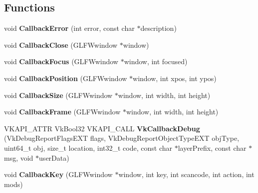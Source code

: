 \subsection*{Functions}
\begin{DoxyCompactItemize}
\item 
\mbox{\label{namespace_flounder_a521c98dcf5547d4998daba9ab53dcd65}} 
void {\bfseries Callback\+Error} (int error, const char $\ast$description)
\item 
\mbox{\label{namespace_flounder_ada14436f2fe02893e7fe7b90d5fb25dc}} 
void {\bfseries Callback\+Close} (G\+L\+F\+Wwindow $\ast$window)
\item 
\mbox{\label{namespace_flounder_a6fa362f255ac8427c2be120fd5baed79}} 
void {\bfseries Callback\+Focus} (G\+L\+F\+Wwindow $\ast$window, int focused)
\item 
\mbox{\label{namespace_flounder_a207d2617f7f9d609f9aad5c9b6b5693f}} 
void {\bfseries Callback\+Position} (G\+L\+F\+Wwindow $\ast$window, int xpos, int ypos)
\item 
\mbox{\label{namespace_flounder_aceb00ffb4c36e8daafa5687e9233b09e}} 
void {\bfseries Callback\+Size} (G\+L\+F\+Wwindow $\ast$window, int width, int height)
\item 
\mbox{\label{namespace_flounder_a492cfd0c11cdb2a74fb82b3c2ada3eee}} 
void {\bfseries Callback\+Frame} (G\+L\+F\+Wwindow $\ast$window, int width, int height)
\item 
\mbox{\label{namespace_flounder_a2e14b3449c0aaf0ef359aa1538c54b7d}} 
V\+K\+A\+P\+I\+\_\+\+A\+T\+TR Vk\+Bool32 V\+K\+A\+P\+I\+\_\+\+C\+A\+LL {\bfseries Vk\+Callback\+Debug} (Vk\+Debug\+Report\+Flags\+E\+XT flags, Vk\+Debug\+Report\+Object\+Type\+E\+XT obj\+Type, uint64\+\_\+t obj, size\+\_\+t location, int32\+\_\+t code, const char $\ast$layer\+Prefix, const char $\ast$msg, void $\ast$user\+Data)
\item 
\mbox{\label{namespace_flounder_a488772e9301b292531e78cad8de693f0}} 
void {\bfseries Callback\+Key} (G\+L\+F\+Wwindow $\ast$window, int key, int scancode, int action, int mods)

\end{DoxyCompactItemize}
